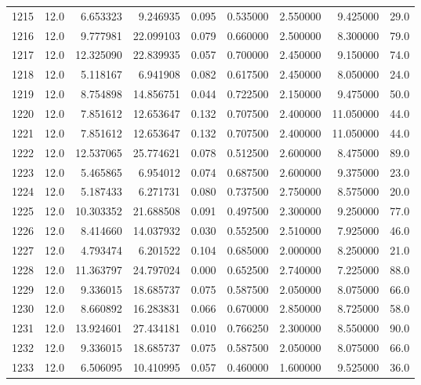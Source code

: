 \begin{tabular}{lrrrrrrrr}
1215 &   12.0 &   6.653323 &   9.246935 &  0.095 &  0.535000 &  2.550000 &   9.425000 &   29.0 \\
1216 &   12.0 &   9.777981 &  22.099103 &  0.079 &  0.660000 &  2.500000 &   8.300000 &   79.0 \\
1217 &   12.0 &  12.325090 &  22.839935 &  0.057 &  0.700000 &  2.450000 &   9.150000 &   74.0 \\
1218 &   12.0 &   5.118167 &   6.941908 &  0.082 &  0.617500 &  2.450000 &   8.050000 &   24.0 \\
1219 &   12.0 &   8.754898 &  14.856751 &  0.044 &  0.722500 &  2.150000 &   9.475000 &   50.0 \\
1220 &   12.0 &   7.851612 &  12.653647 &  0.132 &  0.707500 &  2.400000 &  11.050000 &   44.0 \\
1221 &   12.0 &   7.851612 &  12.653647 &  0.132 &  0.707500 &  2.400000 &  11.050000 &   44.0 \\
1222 &   12.0 &  12.537065 &  25.774621 &  0.078 &  0.512500 &  2.600000 &   8.475000 &   89.0 \\
1223 &   12.0 &   5.465865 &   6.954012 &  0.074 &  0.687500 &  2.600000 &   9.375000 &   23.0 \\
1224 &   12.0 &   5.187433 &   6.271731 &  0.080 &  0.737500 &  2.750000 &   8.575000 &   20.0 \\
1225 &   12.0 &  10.303352 &  21.688508 &  0.091 &  0.497500 &  2.300000 &   9.250000 &   77.0 \\
1226 &   12.0 &   8.414660 &  14.037932 &  0.030 &  0.552500 &  2.510000 &   7.925000 &   46.0 \\
1227 &   12.0 &   4.793474 &   6.201522 &  0.104 &  0.685000 &  2.000000 &   8.250000 &   21.0 \\
1228 &   12.0 &  11.363797 &  24.797024 &  0.000 &  0.652500 &  2.740000 &   7.225000 &   88.0 \\
1229 &   12.0 &   9.336015 &  18.685737 &  0.075 &  0.587500 &  2.050000 &   8.075000 &   66.0 \\
1230 &   12.0 &   8.660892 &  16.283831 &  0.066 &  0.670000 &  2.850000 &   8.725000 &   58.0 \\
1231 &   12.0 &  13.924601 &  27.434181 &  0.010 &  0.766250 &  2.300000 &   8.550000 &   90.0 \\
1232 &   12.0 &   9.336015 &  18.685737 &  0.075 &  0.587500 &  2.050000 &   8.075000 &   66.0 \\
1233 &   12.0 &   6.506095 &  10.410995 &  0.057 &  0.460000 &  1.600000 &   9.525000 &   36.0 \\

\end{tabular}
